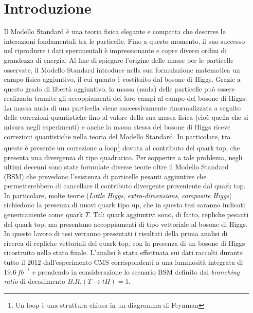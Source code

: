 \chapter*{Introduzione}
Il Modello Standard è una teoria fisica elegante e compatta che descrive le interazioni fondamentali tra le particelle.
Fino a questo momento, il suo successo nel riprodurre i dati sperimentali è impressionante e copre diversi
ordini di grandezza di energia. Al fine di spiegare l'origine delle masse per le particelle osservate, il Modello Standard introduce 
nella sua formulazione matematica un campo fisico aggiuntivo, il cui quanto è costituito dal bosone di Higgs. Grazie a questo grado di libertà aggiuntivo, la massa (nuda)
delle particelle può essere realizzata tramite gli accoppiamenti dei loro campi al campo del bosone di Higgs. La massa nuda di una particella viene successivamente
rinormalizzata a seguito delle correzioni quantistiche fino al valore della sua massa fisica (cioè quella che si misura negli esperimenti) e
anche la massa stessa del bosone di Higgs riceve correzioni quantistiche nella teoria del Modello Standard. In particolare, tra queste
è presente un correzione a loop\footnote{Un loop è una struttura chiusa in un diagramma di Feynman} dovuta al contributo del quark top,
che presenta una divergenza di tipo quadratico.
\newline
Per sopperire a tale problema, negli ultimi decenni sono state formulate
diverse teorie oltre il Modello Standard (\acs{BSM}) che prevedono l'esistenza di particelle pesanti aggiuntive che 
permetterebbero di cancellare il contributo divergente proveniente dal quark top.
\newline
In particolare, molte teorie (\textit{Little Higgs}, \textit{extra-dimensions}, \textit{composite Higgs}) richiedono la presenza
di nuovi quark tipo up, che in questa tesi saranno indicati genericamente come quark $T$.
Tali quark aggiuntivi sono, di fatto, repliche pesanti del quark top, ma presentano accoppiamenti di tipo vettoriale al bosone di Higgs.
\newline
In questo lavoro di tesi verranno presentati i risultati della prima analisi di ricerca di repliche vettoriali del quark top, con la
presenza di un bosone di Higgs ricostruito nello stato finale. L'analisi è stata effettuata sui dati raccolti durante tutto
il 2012 dall'esperimento CMS corrispondenti a una luminosità integrata di $19.6 ~fb^{-1}$ e prendendo in considerazione lo scenario
\acs{BSM} definito dal \textit{branching ratio} di decadimento $B.R.(T\rightarrow tH)=1$.
\newline
